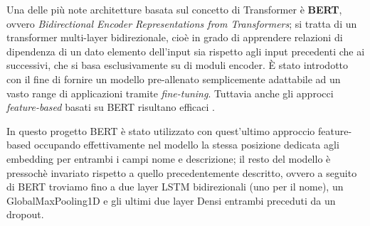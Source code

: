 
Una delle più note architetture basata sul concetto di Transformer è
\textbf{BERT}, ovvero \textit{Bidirectional Encoder Representations from
Transformers}; si tratta di un transformer multi-layer bidirezionale, cioè in
grado di apprendere relazioni di dipendenza di un dato elemento dell'input sia
rispetto agli input precedenti che ai successivi, che si basa esclusivamente su
di moduli encoder. È stato introdotto con il fine di fornire un modello
pre-allenato semplicemente adattabile ad un vasto range di applicazioni tramite
\textit{fine-tuning}. Tuttavia anche gli approcci \textit{feature-based} basati
su BERT risultano efficaci \cite{devlin2018bert}.

In questo progetto BERT è stato utilizzato con quest'ultimo approccio
feature-based occupando effettivamente nel modello la stessa posizione dedicata
agli embedding per entrambi i campi nome e descrizione; il resto del modello è
pressochè invariato rispetto a quello precedentemente descritto, ovvero a
seguito di BERT troviamo fino a due layer LSTM bidirezionali (uno per il nome),
un GlobalMaxPooling1D e gli ultimi due layer Densi entrambi preceduti da un
dropout.



